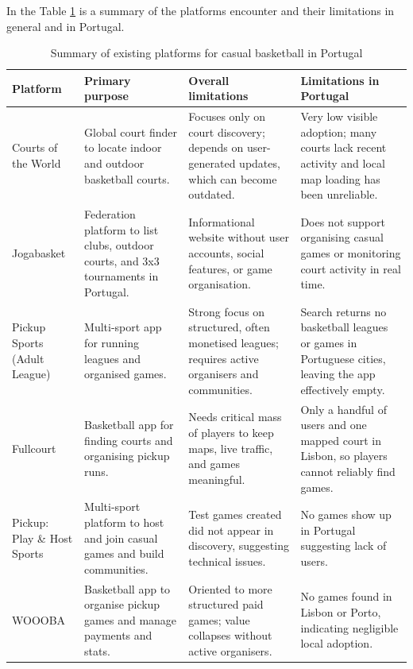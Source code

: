 In the Table \ref{tab:basketball_platforms_summary} is a summary of the platforms encounter and their limitations in general and in Portugal.


\begin{table}[h]
	\centering
	\small
	\caption{Summary of existing platforms for casual basketball in Portugal}
	\label{tab:basketball_platforms_summary}
	\begin{tabularx}{\textwidth}{|p{2.4cm}|X|X|X|}
		\hline
		\textbf{Platform} & \textbf{Primary purpose} & \textbf{Overall limitations} & \textbf{Limitations in Portugal} \\
		\hline
		
		Courts of the World & Global court finder to locate indoor and outdoor basketball courts. & Focuses only on court discovery; depends on user-generated updates, which can become outdated. & Very low visible adoption; many courts lack recent activity and local map loading has been unreliable. \\
		\hline
		
		Jogabasket & Federation platform to list clubs, outdoor courts, and 3x3 tournaments in Portugal. & Informational website without user accounts, social features, or game organisation. & Does not support organising casual games or monitoring court activity in real time. \\
		\hline
		
		Pickup Sports (Adult League) & Multi-sport app for running leagues and organised games. & Strong focus on structured, often monetised leagues; requires active organisers and communities. & Search returns no basketball leagues or games in Portuguese cities, leaving the app effectively empty. \\
		\hline
		
		Fullcourt & Basketball app for finding courts and organising pickup runs. & Needs critical mass of players to keep maps, live traffic, and games meaningful. & Only a handful of users and one mapped court in Lisbon, so players cannot reliably find games. \\
		\hline
		
		Pickup: Play \& Host Sports & Multi-sport platform to host and join casual games and build communities. &  Test games created did not appear in discovery, suggesting technical issues. & No games show up in Portugal  suggesting lack of users. \\
		\hline
		
		WOOOBA & Basketball app to organise pickup games and manage payments and stats. & Oriented to more structured paid games; value collapses without active organisers. & No games found in Lisbon or Porto, indicating negligible local adoption. \\
		\hline
		

\end{tabularx}
\end{table}
